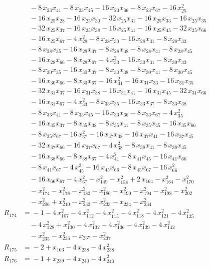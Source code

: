 \begin{align*}
&\quad{} -8\,x_{23} x_{41} -8\,x_{23} x_{45} -16\,x_{23} x_{66} -8\,x_{23} x_{67} -16\,x_{25}^{2} \\
&\quad{} -16\,x_{25} x_{28} -16\,x_{25} x_{30} -32\,x_{25} x_{31} -16\,x_{25} x_{33} -16\,x_{25} x_{35} \\
&\quad{} -32\,x_{25} x_{37} -16\,x_{25} x_{38} -16\,x_{25} x_{41} -16\,x_{25} x_{45} -32\,x_{25} x_{66} \\
&\quad{} -16\,x_{25} x_{67} -4\,x_{28}^{2} -8\,x_{28} x_{30} -16\,x_{28} x_{31} -8\,x_{28} x_{33} \\
&\quad{} -8\,x_{28} x_{35} -16\,x_{28} x_{37} -8\,x_{28} x_{38} -8\,x_{28} x_{41} -8\,x_{28} x_{45} \\
&\quad{} -16\,x_{28} x_{66} -8\,x_{28} x_{67} -4\,x_{30}^{2} -16\,x_{30} x_{31} -8\,x_{30} x_{33} \\
&\quad{} -8\,x_{30} x_{35} -16\,x_{30} x_{37} -8\,x_{30} x_{38} -8\,x_{30} x_{41} -8\,x_{30} x_{45} \\
&\quad{} -16\,x_{30} x_{66} -8\,x_{30} x_{67} -16\,x_{31}^{2} -16\,x_{31} x_{33} -16\,x_{31} x_{35} \\
&\quad{} -32\,x_{31} x_{37} -16\,x_{31} x_{38} -16\,x_{31} x_{41} -16\,x_{31} x_{45} -32\,x_{31} x_{66} \\
&\quad{} -16\,x_{31} x_{67} -4\,x_{33}^{2} -8\,x_{33} x_{35} -16\,x_{33} x_{37} -8\,x_{33} x_{38} \\
&\quad{} -8\,x_{33} x_{41} -8\,x_{33} x_{45} -16\,x_{33} x_{66} -8\,x_{33} x_{67} -4\,x_{35}^{2} \\
&\quad{} -16\,x_{35} x_{37} -8\,x_{35} x_{38} -8\,x_{35} x_{41} -8\,x_{35} x_{45} -16\,x_{35} x_{66} \\
&\quad{} -8\,x_{35} x_{67} -16\,x_{37}^{2} -16\,x_{37} x_{38} -16\,x_{37} x_{41} -16\,x_{37} x_{45} \\
&\quad{} -32\,x_{37} x_{66} -16\,x_{37} x_{67} -4\,x_{38}^{2} -8\,x_{38} x_{41} -8\,x_{38} x_{45} \\
&\quad{} -16\,x_{38} x_{66} -8\,x_{38} x_{67} -4\,x_{41}^{2} -8\,x_{41} x_{45} -16\,x_{41} x_{66} \\
&\quad{} -8\,x_{41} x_{67} -4\,x_{45}^{2} -16\,x_{45} x_{66} -8\,x_{45} x_{67} -16\,x_{66}^{2} \\
&\quad{} -16\,x_{66} x_{67} -4\,x_{67}^{2} -x_{149}^{2} -x_{158}^{2} +2\,x_{164} -x_{164}^{2} -x_{170}^{2} \\
&\quad{} -x_{174}^{2} -x_{178}^{2} -x_{182}^{2} -x_{186}^{2} -x_{190}^{2} -x_{194}^{2} -x_{198}^{2} -x_{202}^{2} \\
&\quad{} -x_{206}^{2} +x_{210}^{2} -x_{232}^{2} -x_{233}^{2} -x_{234} -x_{234}^{2} \\[2pt]
R_{174} &={} -1 -4\,x_{107}^{2} -4\,x_{112}^{2} -4\,x_{115}^{2} -4\,x_{118}^{2} -4\,x_{121}^{2} -4\,x_{125}^{2} \\
&\quad{} -4\,x_{128}^{2} +x_{130}^{2} -4\,x_{132}^{2} -4\,x_{136}^{2} -4\,x_{139}^{2} -4\,x_{142}^{2} \\
&\quad{} -x_{235}^{2} -x_{236}^{2} -x_{237} -x_{237}^{2} \\[2pt]
R_{175} &={} -2 +x_{103} -4\,x_{238} -4\,x_{238}^{2} \\[2pt]
R_{176} &={} -1 +x_{239} -4\,x_{240} -4\,x_{240}^{2}
\end{align*}
